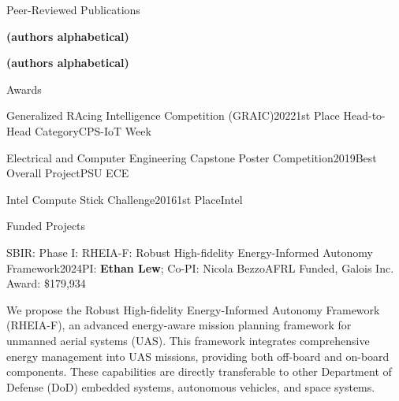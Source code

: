 \documentclass{resume}
\begin{document}
\begin{rSection}{Peer-Reviewed Publications}


\textbf{(authors alphabetical)} 




\textbf{(authors alphabetical)} 

\end{rSection}

\begin{rSection}{Awards}
\begin{rSubsectionEmpty}{Generalized RAcing Intelligence Competition (GRAIC)}{2022}{1st Place Head-to-Head Category}{CPS-IoT Week}\end{rSubsectionEmpty}

\begin{rSubsectionEmpty}{Electrical and Computer Engineering Capstone Poster Competition}{2019}{Best Overall Project}{PSU ECE}\end{rSubsectionEmpty}

\begin{rSubsectionEmpty}{Intel Compute Stick Challenge}{2016}{1st Place}{Intel}\end{rSubsectionEmpty}
\end{rSection}


\begin{rSection}{Funded Projects}
\begin{rSubsection}{SBIR: Phase I: RHEIA-F: Robust High-fidelity Energy-Informed Autonomy Framework}{2024}{PI: \textbf{Ethan Lew}; Co-PI: Nicola Bezzo}{AFRL Funded, Galois Inc. Award: \$179,934}
\item We propose the Robust High-fidelity Energy-Informed Autonomy Framework (RHEIA-F), an advanced energy-aware mission planning framework for unmanned aerial systems (UAS). This framework integrates comprehensive energy management into UAS missions, providing both off-board and on-board components. These capabilities are directly transferable to other Department of Defense (DoD) embedded systems, autonomous vehicles, and space systems.
\end{rSubsection}
\end{rSection}
\end{document}
